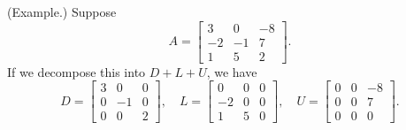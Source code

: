 \documentclass[letterpaper]{article}
\newcommand{\0}{\mathbf{0}}
\begin{document}
\begin{mdframed}
    (Example.) Suppose \[A = \begin{bmatrix}
        3 & 0 & -8 \\ 
        -2 & -1 & 7 \\ 
        1 & 5 & 2
    \end{bmatrix}.\]
    If we decompose this into $D + L + U$, we have 
    \[D = \begin{bmatrix}
        3 & 0 & 0 \\ 0 & -1 & 0 \\ 0 & 0 & 2
    \end{bmatrix}, \quad L = \begin{bmatrix}
        0 & 0 & 0 \\ -2 & 0 & 0 \\ 1 & 5 & 0
    \end{bmatrix}, \quad U = \begin{bmatrix}
        0 & 0 & -8 \\ 0 & 0 & 7 \\ 0 & 0 & 0
    \end{bmatrix}.\]
\end{mdframed}
\end{document}
